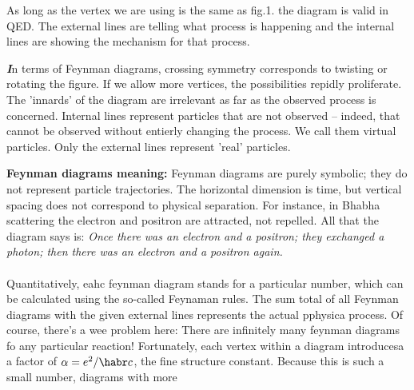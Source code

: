 \documentclass[10pt,a4paper]{article}
\newenvironment{callout}
	{\begin{calloutbox}\color{charcoal}\textbf\textit}
	{\end{calloutbox}}
\begin{document}
            As long as the vertex we are using is the same as fig.1. the diagram is valid in QED. The external lines are telling what process is happening and the internal lines are showing the mechanism for that process.
            \begin{callout}
                In terms of Feynman diagrams, crossing symmetry corresponds to twisting or rotating the figure. If we allow more vertices, the possibilities repidly proliferate. The 'innards' of the diagram are irrelevant as far as the observed process is concerned. Internal lines represent particles that are not observed -- indeed, that cannot be observed without entierly changing the process. We call them virtual particles. Only the external lines represent 'real' particles.
            \end{callout}
            \textbf{Feynman diagrams meaning:} Feynman diagrams are purely symbolic; they do not represent particle trajectories. The horizontal dimension is time, but vertical spacing does not correspond to physical separation. For instance, in Bhabha scattering the electron and positron are attracted, not repelled. All that the diagram says is: \textit{Once there was an electron and a positron; they exchanged a photon; then there was an electron and a positron again.}
            \\
            \\
            \indent Quantitatively, eahc feynman diagram stands for a particular number, which can be calculated using the so-called Feynaman rules. The sum total of all Feynman diagrams with the given external lines represents the actual pphysica process. Of course, there's a wee problem here: There are infinitely many feynman diagrams fo any particular reaction! Fortunately, each vertex within a diagram introducesa a factor of $\alpha = e^2/\habr c$, the fine structure constant. Because this is such a small number, diagrams with more 
\end{document}

